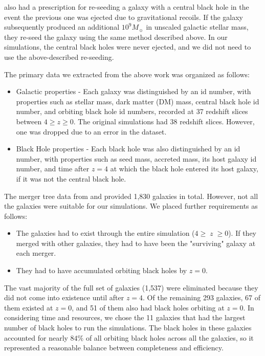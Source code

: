 \documentclass[fleqn,usenatbib,useAMS]{mnras}
\begin{document}
\citet{2015ApJ...799..178K} also had a prescription for re-seeding a galaxy with a central black hole in the event the previous one was ejected due to gravitational recoils. If the galaxy subsequently produced an additional $10^9M_{\sun}$ in unscaled galactic stellar mass, they re-seed the galaxy using the same method described above.  In our simulations, the central black holes were never ejected, and we did not need to use the above-described re-seeding.

The primary data we extracted from the above work was organized as follows:
\begin{itemize}
    \item Galactic properties - Each galaxy was distinguished by an id number, with properties such as stellar mass, dark matter (DM) mass, central black hole id number, and orbiting black hole id numbers, recorded at 37 redshift slices between $4\geq z \geq0$. The original \citet{2015ApJ...799..178K} simulations had 38 redshift slices.  However, one was dropped due to an error in the dataset.
    \item Black Hole properties - Each black hole was also distinguished by an id number, with properties such as seed mass, accreted mass, its host galaxy id number, and time after $z=4$ at which the black hole entered its host galaxy, if it was not the central black hole.
\end{itemize}

The merger tree data from \citet{2012MNRAS.425..641L} and \citet{2015ApJ...799..178K} provided 1,830 galaxies in total.  However, not all the galaxies were suitable for our simulations.  We placed further requirements as follows:
\begin{itemize}
\item The galaxies had to exist through the entire simulation ($4\geq\;z\;\geq 0$).  If they merged with other galaxies, they had to have been the "surviving" galaxy at each merger.
\item They had to have accumulated orbiting black holes by $z = 0$.
\end{itemize}

The vast majority of the full set of galaxies (1,537) were eliminated because they did not come into existence until after $z=4$.  Of the remaining 293 galaxies, 67 of them existed at $z=0$, and 51 of them also had black holes orbiting at $z=0$.  In considering time and resources, we chose the 11 galaxies that had the largest number of black holes to run the simulations.  The black holes in these galaxies accounted for nearly $84{\%}$ of all orbiting black holes across all the galaxies, so it represented a reasonable balance between completeness and efficiency.
\end{document}
